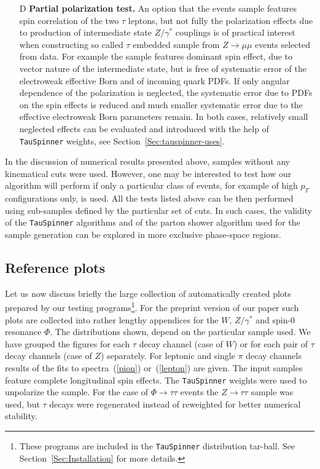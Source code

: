 \documentclass{article}
\begin{document}
\begin{enumerate}
\item[D]{\bf Partial polarization test.}
An option that the events sample features  spin correlation of the 
two $\tau$ leptons, but not fully the polarization effects due to production of intermediate 
state $Z/\gamma^{*}$ couplings is of practical interest when constructing so called $\tau$ embedded
sample from $Z \to \mu \mu$ events selected from data.  
For example the sample features dominant spin effect, due to vector nature of the
intermediate state, but is free of systematic error of 
the  electroweak effective Born and of incoming quark PDFs. If only angular dependence of the 
polarization is neglected, the systematic error due to PDFs on the spin effects  is reduced
and much smaller systematic error due to the effective electroweak Born parameters remain. In both cases,
relatively small neglected effects can be evaluated and introduced  with the help of {\tt TauSpinner}
weights, see Section~\ref{Sec:tauspinner-uses}.
\end{enumerate}

In the discussion of numerical results presented above, samples 
without any kinematical cuts were used. However, one may be interested
to test how our algorithm will perform if only a particular class 
of events, for example of high 
$p_T$ configurations only, is used.
All the tests listed above can be then performed using  sub-samples defined
by the particular set of cuts.
In such cases,  the validity of the  {\tt TauSpinner} algorithms and of the parton shower
algorithm used for the sample generation can be explored in more exclusive phase-space regions.

\subsection{Reference plots} \label{Sec:PlotAppendices}



Let us now discuss briefly the large collection of automatically created plots prepared by our testing programs\footnote{
These programs are included in the {\tt TauSpinner} distribution tar-ball. See Section~\ref{Sec:Installation} for more details.}. For the 
preprint version of our paper such plots are collected into rather lengthy  appendices for the $W$, $Z/\gamma^*$ and spin-0 resonance $\Phi$.
The distributions shown, depend on the particular sample used. 
We have grouped the figures for  each $\tau$ decay channel (case of $W$)
or for each pair of $\tau$ decay channels (case of $Z$) separately. 
For leptonic and single $\pi$ decay channels
results of the fits to spectra~(\ref{pion}) or~(\ref{lepton}) are given.
The input samples feature complete longitudinal spin effects. 
The {\tt TauSpinner} weights were used to unpolarize the sample. For the case 
of $\Phi \to \tau \tau$  events the $Z \to \tau \tau$ sample was used, but
$\tau$ decays were regenerated instead of reweighted for better numerical stability. 
\end{document}
